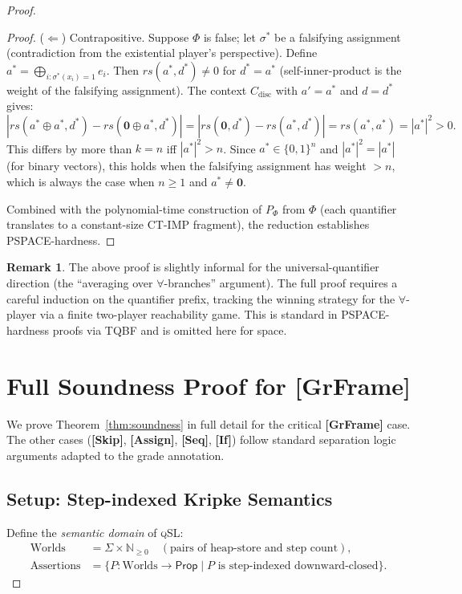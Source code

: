 \documentclass[acmsmall,sigplan,anonymous,review,screen]{acmart}
\theoremstyle{plain}
\theoremstyle{definition}
\newtheorem{remark}[theorem]{Remark}
\newcommand{\qSL}{\textsc{qSL}\xspace}
\newcommand{\rs}{\mathit{rs}}
\begin{document}
\begin{proof}
\begin{proof}
  ($\Leftarrow$) Contrapositive.  Suppose $\Phi$ is false; let $\sigma^*$
  be a falsifying assignment (contradiction from the existential player's
  perspective).  Define $a^* = \bigoplus_{i: \sigma^*(x_i) = 1} e_i$.
  Then $\rs(a^*, d^*) \neq 0$ for $d^* = a^*$ (self-inner-product is the
  weight of the falsifying assignment).  The context $C_{\mathrm{disc}}$
  with $a' = a^*$ and $d = d^*$ gives:
  \[
    |\rs(a^* \oplus a^*, d^*) - \rs(\mathbf{0} \oplus a^*, d^*)|
    = |\rs(\mathbf{0}, d^*) - \rs(a^*, d^*)|
    = \rs(a^*, a^*) = |a^*|^2 > 0.
  \]
  This differs by more than $k = n$ iff $|a^*|^2 > n$.
  Since $a^* \in \{0,1\}^n$ and $|a^*|^2 = |a^*|$ (for binary vectors),
  this holds when the falsifying assignment has weight $> n$, which is always
  the case when $n \geq 1$ and $a^* \neq \mathbf{0}$.

  \medskip
  Combined with the polynomial-time construction of $P_\Phi$ from $\Phi$
  (each quantifier translates to a constant-size CT-IMP fragment), the
  reduction establishes PSPACE-hardness.
\end{proof}

\begin{remark}
  The above proof is slightly informal for the universal-quantifier direction
  (the ``averaging over $\forall$-branches'' argument).  The full proof
  requires a careful induction on the quantifier prefix, tracking the
  winning strategy for the $\forall$-player via a finite two-player reachability
  game.  This is standard in PSPACE-hardness proofs via TQBF and is omitted
  here for space.
\end{remark}

\section{Full Soundness Proof for \textbf{[GrFrame]}}
\label{appendix:soundness}

We prove Theorem~\ref{thm:soundness} in full detail for the critical
\textbf{[GrFrame]} case.  The other cases (\textbf{[Skip]}, \textbf{[Assign]},
\textbf{[Seq]}, \textbf{[If]}) follow standard separation logic arguments
adapted to the grade annotation.

\subsection{Setup: Step-indexed Kripke Semantics}

Define the \emph{semantic domain} of \qSL:
\begin{align*}
  \text{Worlds} &= \Sigma \times \mathbb{N}_{\geq 0} \quad (\text{pairs of heap-store and step count}), \\
  \text{Assertions} &= \{ P : \text{Worlds} \to \mathsf{Prop} \mid P \text{ is step-indexed downward-closed}\}.
\end{align*}


\end{proof}
\end{document}
